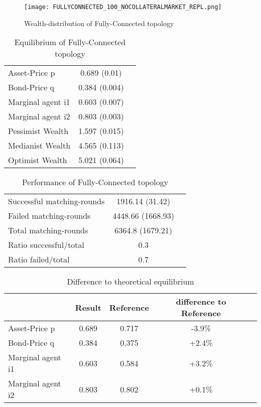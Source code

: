 \documentclass[Bachelorarbeit.tex]{subfiles}
\begin{document}
\begin{figure}[H]
	\centering
  \texttt{[image: FULLYCONNECTED\_100\_NOCOLLATERALMARKET\_REPL.png]}
	\caption{Wealth-distribution of Fully-Connected topology}
	\label{fig:wealth_FULLYCONNECTED_100_NOCOLLATERALMARKET_REPL}
\end{figure}

\begin{table}[H]
	\caption{Equilibrium of Fully-Connected topology}
	\centering
	\begin{tabular} { l c r }
		\hline
		Asset-Price p & 0.689 (0.01) \\
		Bond-Price q & 0.384 (0.004) \\
		Marginal agent i1 & 0.603 (0.007) \\
		Marginal agent i2 & 0.803 (0.003) \\
		\hline
		Pessimist Wealth & 1.597 (0.015) \\
		Medianist Wealth & 4.565 (0.113) \\
		Optimist Wealth & 5.021 (0.064) \\
		\hline
	\end{tabular}
	\label{tab:fullyconnected_equilibrium_100Agents_05Bond}
\end{table} 

\begin{table}[H]
	\caption{Performance of Fully-Connected topology}
	\centering
	\begin{tabular} { l c r }
		\hline
		Successful matching-rounds & 1916.14 (31.42) \\
		Failed matching-rounds & 4448.66 (1668.93) \\
		Total matching-rounds & 6364.8 (1679.21) \\
		\hline
		Ratio successful/total & 0.3 \\
		Ratio failed/total & 0.7 \\
		\hline
	\end{tabular}
\end{table}

\begin{table}[H]
	\caption{Difference to theoretical equilibrium}
	\centering
	\begin{tabular} { l c c c r }
		& Result & Reference & difference to Reference \\
		\hline
		Asset-Price p & 0.689 & 0.717 & -3.9\% \\
		Bond-Price q & 0.384 & 0.375 & +2.4\% \\
		Marginal agent i1 & 0.603  & 0.584 & +3.2\% \\
		Marginal agent i2 & 0.803 & 0.802 & +0.1\% \\
		\hline
	\end{tabular}
\end{table}
\end{document}
